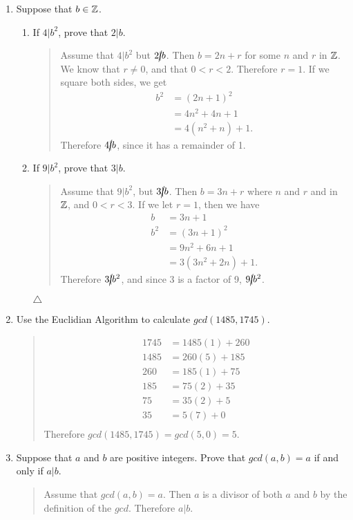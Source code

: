 \documentclass{hw}
\begin{document}
\begin{enumerate}
\item Suppose that $b\in\mathbb{Z}$.
\begin{enumerate}
\item If $4|b^{2}$, prove that $2|b$.
\begin{quote}
Assume that $4|b^{2}$ but $2\cancel{|}b$. Then $b = 2n + r$ for some $n$ and $r$ in $\mathbb{Z}$. We know
that $r\neq 0$, and that $0 < r < 2$. Therefore $r = 1$. If we square both sides, we get
\begin{align*}
b^{2} &= (2n+1)^{2}\\
&= 4n^{2}+4n+1\\
&= 4(n^{2} + n) + 1.
\end{align*}
Therefore $4\cancel{|}b$, since it has a remainder of 1.
\end{quote}
\item If $9|b^{2}$, prove that $3|b$.
\begin{quote}
Assume that $9|b^{2}$, but $3\cancel{|}b$. Then $b=3n+r$ where $n$ and $r$ and in $\mathbb{Z}$, and
$0 < r < 3$. If we let $r=1$, then we have
\begin{align*}
b &= 3n + 1\\
b^{2} &= (3n+1)^{2}\\
&= 9n^{2} + 6n + 1\\
&= 3(3n^{2} + 2n) + 1.
\end{align*}
Therefore $3\cancel{|}b^{2}$, and since 3 is a factor of 9, $9\cancel{|}b^{2}$.
\end{quote}
$\triangle$
\end{enumerate}

\item Use the Euclidian Algorithm to calculate $gcd(1485,1745)$.
\begin{quote}
\begin{align*}
1745 &= 1485(1) + 260\\
1485 &= 260(5) + 185\\
260 &= 185(1) + 75\\
185 &= 75(2) + 35\\
75 &= 35(2) + 5\\
35 &= 5(7) + 0\\
\end{align*}
Therefore $gcd(1485,1745) = gcd(5,0) = 5$.
\end{quote}

\item Suppose that $a$ and $b$ are positive integers. Prove that $gcd(a,b) = a$ if and
only if $a|b$.
\begin{quote}
Assume that $gcd(a,b) = a$. Then $a$ is a divisor of both $a$ and $b$ by the definition of the $gcd$.
Therefore $a|b$.
\end{quote}
\end{enumerate}
\end{document}
